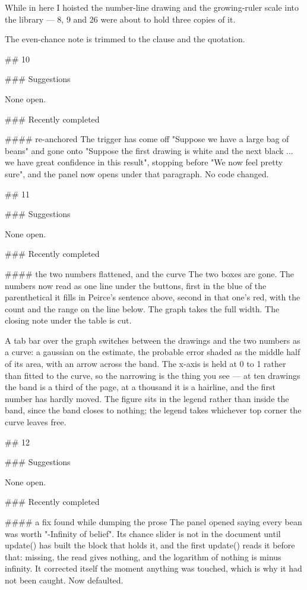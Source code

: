 While in here I hoisted the number-line drawing and the growing-ruler scale
into the library — 8, 9 and 26 were about to hold three copies of it.

The even-chance note is trimmed to the clause and the quotation.


## 10

### Suggestions

None open.

### Recently completed

#### re-anchored
The trigger has come off "Suppose we have a large bag of beans" and gone onto
"Suppose the first drawing is white and the next black ... we have great
confidence in this result", stopping before "We now feel pretty sure", and the
panel now opens under that paragraph. No code changed.


## 11

### Suggestions

None open.

### Recently completed

#### the two numbers flattened, and the curve
The two boxes are gone. The numbers now read as one line under the buttons,
first in the blue of the parenthetical it fills in Peirce's sentence above,
second in that one's red, with the count and the range on the line below. The
graph takes the full width. The closing note under the table is cut.

A tab bar over the graph switches between the drawings and the two numbers as a
curve: a gaussian on the estimate, the probable error shaded as the middle half
of its area, with an arrow across the band. The x-axis is held at 0 to 1 rather
than fitted to the curve, so the narrowing is the thing you see — at ten
drawings the band is a third of the page, at a thousand it is a hairline, and
the first number has hardly moved. The figure sits in the legend rather than
inside the band, since the band closes to nothing; the legend takes whichever
top corner the curve leaves free.


## 12

### Suggestions

None open.

### Recently completed

#### a fix found while dumping the prose
The panel opened saying every bean was worth "-Infinity of belief". Its chance
slider is not in the document until update() has built the block that holds it,
and the first update() reads it before that: missing, the read gives nothing,
and the logarithm of nothing is minus infinity. It corrected itself the moment
anything was touched, which is why it had not been caught. Now defaulted.

